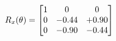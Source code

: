 \documentclass[preview]{standalone}
\begin{document}
\begin{align*}
\special{dvisvgm:raw <g id='unique000'>}R_{x}(\theta) = \begin{bmatrix}1 & 0 & 0 \\0 & -0.44 & +0.90 \\0 & -0.90 & -0.44\end{bmatrix}\special{dvisvgm:raw </g>}
\end{align*}
\end{document}
